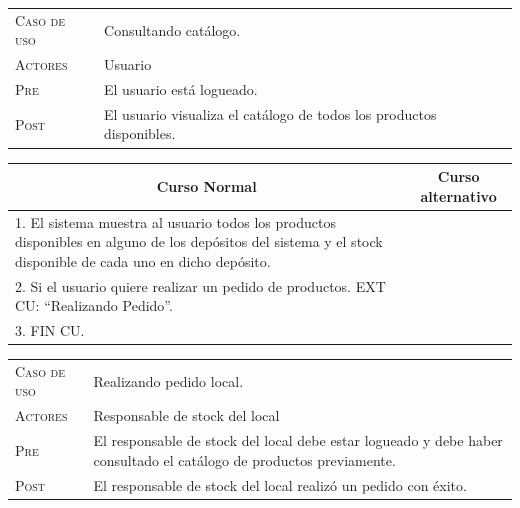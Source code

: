 \begin{tabular}{p{} p{}}
    \textsc{Caso de uso} & Consultando catálogo. \\
    \textsc{Actores} & Usuario \\
    \textsc{Pre} & El usuario está logueado. \\
    \textsc{Post} & El usuario visualiza el catálogo de todos los productos
    disponibles. \\
\end{tabular}

\begin{center}
\begin{tabular}{|p{}|p{}|}
    \hline
    \multicolumn{1}{|c|}{Curso Normal} &
    \multicolumn{1}{|c|}{Curso alternativo} \\
    \hline
    1. El sistema muestra al usuario todos los productos disponibles en alguno de los depósitos del sistema y el stock disponible de cada uno en dicho depósito. & \\
    2. Si el usuario quiere realizar un pedido de productos. EXT CU:
    ``Realizando Pedido''. & \\
    3. FIN CU. & \\
    \hline
\end{tabular}
\end{center}

\begin{tabular}{p{} p{}}
    \textsc{Caso de uso} & Realizando pedido local. \\
    \textsc{Actores} & Responsable de stock del local \\
    \textsc{Pre} & El responsable de stock del local debe estar logueado y debe
    haber consultado el catálogo de productos previamente. \\
    \textsc{Post} & El responsable de stock del local realizó un pedido con
    éxito. \\
\end{tabular}

